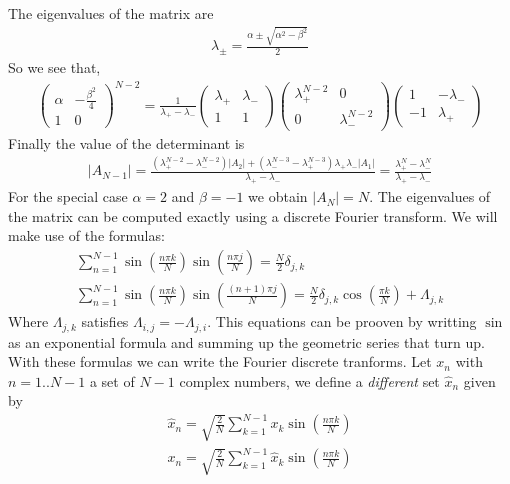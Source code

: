 \documentclass[12pt]{article}
\begin{document}
The eigenvalues of the matrix are
\begin{gather}
\lambda_{\pm}=\frac{\alpha\pm\sqrt{\alpha^2-\beta^2}}{2}
\end{gather}
So we see that,
\begin{gather}
\left(\begin{matrix} \alpha & -\frac{\beta^2}{4}\\ 1 & 0\end{matrix}\right)^{N-2}=\frac{1}{\lambda_+-\lambda_-}
\left(\begin{matrix} \lambda_+ & \lambda_- \\ 1 & 1\end{matrix}\right) \left(\begin{matrix} \lambda_+^{N-2} & 0\\ 0 & \lambda_-^{N-2}\end{matrix}\right)
\left(\begin{matrix} 1 & -\lambda_-\\ -1 & \lambda_+\end{matrix}\right)
\end{gather}
Finally the value of the determinant is
\begin{gather}
|A_{N-1}|=\frac{(\lambda_+^{N-2}-\lambda_-^{N-2})|A_2|+(\lambda_-^{N-3}-\lambda_+^{N-3})\lambda_+\lambda_-|A_1|}{\lambda_+-\lambda_-}=\frac{\lambda_+^{N}-\lambda_-^{N}}{\lambda_+-\lambda_-}
\end{gather}
For the special case $\alpha=2$ and $\beta=-1$ we obtain $|A_N|=N$. The eigenvalues of the matrix can be computed exactly using a discrete Fourier transform. We will make use of the formulas:
\begin{gather}
\sum_{n=1}^{N-1}\sin\left(\frac{n\pi k}{N}\right)\sin\left(\frac{n\pi j}{N}\right)=\frac{N}{2}\delta_{j,k} \\
\sum_{n=1}^{N-1}\sin\left(\frac{n\pi k}{N}\right)\sin\left(\frac{(n+1)\pi j}{N}\right)=\frac{N}{2}\delta_{j,k}\cos\left(\frac{\pi k}{N}\right)+\Lambda_{j,k}
\end{gather}
Where $\Lambda_{j,k}$ satisfies $\Lambda_{i,j}=-\Lambda_{j,i}$. This equations can be prooven by writting $\sin$ as an exponential formula and summing up the geometric series that turn up.
With these formulas we can write the Fourier discrete tranforms. Let $x_n$ with $n=1..N-1$ a set of $N-1$ complex numbers, we define a \textit{different} set $\hat x_n$ given by
\begin{gather}
\hat x_n=\sqrt{\frac{2}{N}}\sum_{k=1}^{N-1}x_k\sin\left(\frac{n\pi k}{N}\right) \\
x_n=\sqrt{\frac{2}{N}}\sum_{k=1}^{N-1}\hat x_k\sin\left(\frac{n\pi k}{N}\right)
\end{gather}
\end{document}
